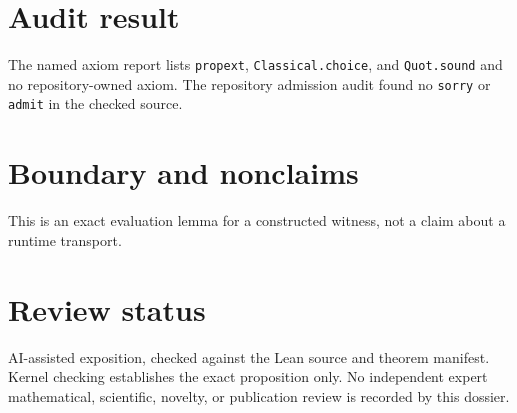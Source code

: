 \documentclass[11pt]{article}
\begin{document}
\section{Audit result}
The named axiom report lists \texttt{propext}, \texttt{Classical.choice}, and
\texttt{Quot.sound} and no repository-owned axiom.  The repository admission audit found no
\texttt{sorry} or \texttt{admit} in the checked source.

\section{Boundary and nonclaims}
This is an exact evaluation lemma for a constructed witness, not a claim about a runtime transport.

\section{Review status}
AI-assisted exposition, checked against the Lean source and theorem manifest.  Kernel checking
establishes the exact proposition only.  No independent expert mathematical, scientific,
novelty, or publication review is recorded by this dossier.
\end{document}
